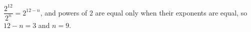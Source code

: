 $\dfrac{2^{12}}{2^n}=2^{12-n}$, and powers of $2$ are equal only when their exponents are equal, so $12-n=3$ and $n=\boxed{9}$.
